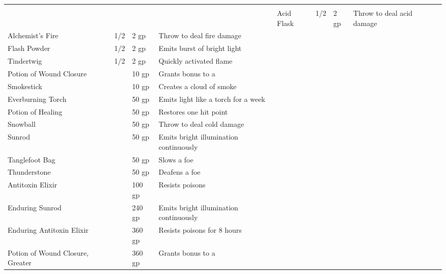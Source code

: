 
\begin{longtablewrapper}
\begin{longtable}{p{15em} p{3em} p{6em} p{25em} p{3em}}

 \\
 &  &  &  &  \tableheaderrule
Acid Flask & 1/2 & 2 gp & Throw to deal acid damage & \pageref{item:Acid Flask} \\
Alchemist's Fire & 1/2 & 2 gp & Throw to deal fire damage & \pageref{item:Alchemist's Fire} \\
Flash Powder & 1/2 & 2 gp & Emits burst of bright light & \pageref{item:Flash Powder} \\
Tindertwig & 1/2 & 2 gp & Quickly activated flame & \pageref{item:Tindertwig} \\
Potion of Wound Closure &  & 10 gp & Grants  bonus to a  & \pageref{item:Potion of Wound Closure} \\
Smokestick &  & 10 gp & Creates a cloud of smoke & \pageref{item:Smokestick} \\
Everburning Torch &  & 50 gp & Emits light like a torch for a week & \pageref{item:Everburning Torch} \\
Potion of Healing &  & 50 gp & Restores one hit point & \pageref{item:Potion of Healing} \\
Snowball &  & 50 gp & Throw to deal cold damage & \pageref{item:Snowball} \\
Sunrod &  & 50 gp & Emits bright illumination continuously & \pageref{item:Sunrod} \\
Tanglefoot Bag &  & 50 gp & Slows a foe & \pageref{item:Tanglefoot Bag} \\
Thunderstone &  & 50 gp & Deafens a foe & \pageref{item:Thunderstone} \\
Antitoxin Elixir &  & 100 gp & Resists poisons & \pageref{item:Antitoxin Elixir} \\
Enduring Sunrod &  & 240 gp & Emits bright illumination continuously & \pageref{item:Enduring Sunrod} \\
Enduring Antitoxin Elixir &  & 360 gp & Resists poisons for 8 hours & \pageref{item:Enduring Antitoxin Elixir} \\
Potion of Wound Closure, Greater &  & 360 gp & Grants  bonus to a  & \pageref{item:Potion of Wound Closure, Greater} \\

\end{longtable}
\end{longtablewrapper}
